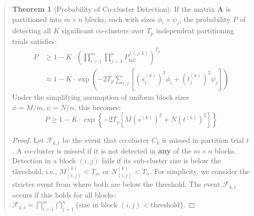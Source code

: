 \documentclass{ar2rc}
\theoremstyle{definition}
\newtheorem*{theorem*}{Theorem}
\theoremstyle{remark} %
\begin{document}
\begin{quote}
  \begin{theorem*}[Probability of Co-cluster Detection]
    If the matrix $\mathbf{A}$ is partitioned into $m \times n$ blocks, each with sizes $\phi_i \times \psi_j$, the probability $P$ of detecting all $K$ significant co-clusters over $T_p$ independent partitioning trials satisfies:
    \begin{equation}
      \begin{aligned}
        P & \geq 1 - K \cdot \left(\prod_{i=1}^m \prod_{j=1}^n P_\text{fail}^{(i,j,k)}\right)^{T_p}                             \\
          & \approx 1 - K \cdot \exp\left( -2 T_p \sum_{i,j} \left[ (s_i^{(k)})^2 \phi_i + (t_j^{(k)})^2 \psi_j \right] \right)
      \end{aligned}
    \end{equation}
    Under the simplifying assumption of uniform block sizes $\phi = M/m, \psi=N/n$, this becomes:
    \begin{equation}
      P \geq 1 - K \cdot \exp \left\{ -2 T_p \left[ M (s^{(k)})^2 + N (t^{(k)})^2 \right] \right\}
    \end{equation}
  \end{theorem*}


  \begin{proof}
    Let $\mathcal{F}_{k,t}$ be the event that co-cluster $C_k$ is missed in partition trial $t$. A co-cluster is missed if it is not detected in \textbf{any} of the $m \times n$ blocks. Detection in a block $(i,j)$ fails if its sub-cluster size is below the threshold, i.e., $M_{(i,j)}^{(k)} < T_m$ or $N_{(i,j)}^{(k)} < T_n$. For simplicity, we consider the stricter event from  where both are below the threshold. The event $\mathcal{F}_{k,t}$ occurs if this holds for all blocks: $\mathcal{F}_{k,t} = \bigcap_{i=1}^m \bigcap_{j=1}^n \{\text{size in block }(i,j) < \text{threshold}\}$.


\end{proof}
\end{quote}
\end{document}
